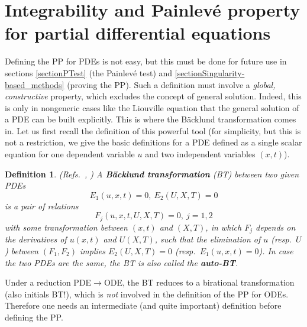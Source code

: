 \documentclass[10pt]{article}
\newtheorem{definition}{Definition}
\begin{document}
\section{Integrability and Painlev\'e property for
         partial differential equations}

Defining the PP for PDEs is not easy, 
but this must be done for future use in sections
\ref{sectionPTest} (the Painlev\'e test)
and 
\ref{sectionSingularity-based_methods} (proving the PP).
Such a definition must involve a \textit{global, constructive} property,
which excludes the concept of general solution. 
Indeed, this is only in nongeneric cases like the Liouville equation
that the general solution of a PDE can be built explicitly.
This is where the B\"acklund transformation comes in.
Let us first recall the definition of this powerful tool
(for simplicity, but this is not a restriction,
we give the basic definitions for a PDE defined as a single scalar equation
for one dependent variable $u$ and two independent variables $(x,t)$).

\begin{definition}
(Refs.~\cite[vol.~III chap.~XII]{DarbouxSurfaces}, \cite{MatveevSalle})
A \textbf{B\"acklund transformation}
(BT)
between two given PDEs
\begin{equation}
 E_1(u,x,t)=0,\ E_2(U,X,T)=0
\end{equation}
is a pair of relations
\begin{equation}
 F_j(u,x,t,U,X,T)=0,\ j=1,2
\label{eqBT}
\end{equation}
with some transformation between $(x,t)$ and $(X,T)$,
in which $F_j$ depends on the derivatives of $u(x,t)$ and $U(X,T)$,
such that the elimination of $u$ (resp.~$U$) between $(F_1,F_2)$
implies
$E_2(U,X,T)=0$ (resp.~$E_1(u,x,t)=0$).
In case the two PDEs are the same,
the BT is also called the \textbf{auto-BT}.
\end{definition}

Under a reduction PDE$\to$ODE,
the BT reduces to a birational transformation (also initials BT!),
which is \textit{not} involved in the definition of the PP for ODEs.
Therefore one needs an intermediate (and quite important) definition
before defining the PP.
\end{document}
